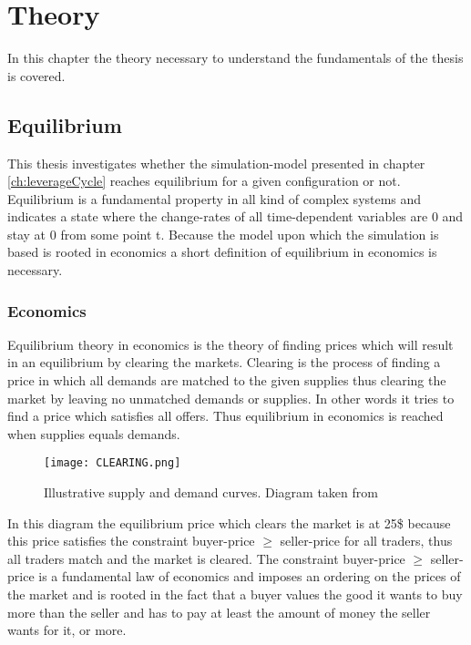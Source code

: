 \documentclass[../Bachelorarbeit.tex]{subfiles}
\begin{document}
\graphicspath{{./figures/theory/}}	%

\chapter{Theory}
\label{ch:theory}

In this chapter the theory necessary to understand the fundamentals of the thesis is covered. 

\section{Equilibrium}
This thesis investigates whether the simulation-model presented in chapter \ref{ch:leverageCycle} reaches equilibrium for a given configuration or not. Equilibrium is a fundamental property in all kind of complex systems and indicates a state where the change-rates of all time-dependent variables are 0 and stay at 0 from some point t. Because the model upon which the simulation is based is rooted in economics a short definition of equilibrium in economics is necessary.

\subsection{Economics}
Equilibrium theory in economics is the theory of finding prices which will result in an equilibrium by clearing the markets. Clearing is the process of finding a price in which all demands are matched to the given supplies thus clearing the market by leaving no unmatched demands or supplies. In other words it tries to find a price which satisfies all offers. Thus equilibrium in economics is reached when supplies equals demands.

\begin{figure}[H]
	\centering
  \texttt{[image: CLEARING.png]}
  	\caption{Illustrative supply and demand curves. Diagram taken from \cite{Parsons2006}}
	\label{fig:CLEARING}
\end{figure}

In this diagram the equilibrium price which clears the market is at 25\$ because this price satisfies the constraint buyer-price $\geq$ seller-price for all traders, thus all traders match and the market is cleared. The constraint buyer-price $\geq$ seller-price is a fundamental law of economics and imposes an ordering on the prices of the market and is rooted in the fact that a buyer values the good it wants to buy more than the seller and has to pay at least the amount of money the seller wants for it, or more. 
\end{document}
